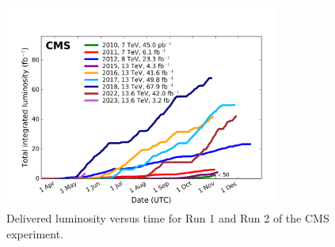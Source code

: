\begin{figure}[!htp]
\centering
\includegraphics[width=0.8\textwidth]{ashish_thesis/CMS_luminosity.png}
\caption{%
    Delivered luminosity versus time for Run 1 and Run 2 of the CMS experiment.
}
\label{fig:lumi}
\end{figure}



